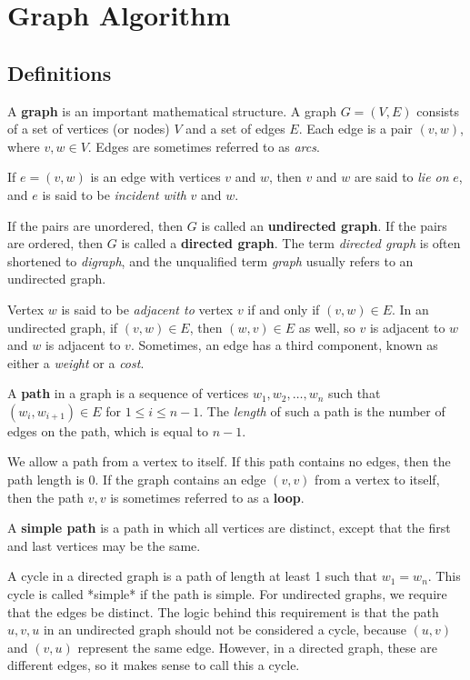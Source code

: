 \chapter{Graph Algorithm}

\section{Definitions}
A \textbf{graph} is an important mathematical structure. A graph \(G = (V, E)\) consists of a set of vertices (or nodes) \(V\) and a set of edges \(E\). Each edge is a pair \((v, w)\), where \(v, w \in V\). Edges are sometimes referred to as \textit{arcs}.

If \(e = (v, w)\) is an edge with vertices \(v\) and \(w\), then \(v\) and \(w\) are said to \textit{lie on} \(e\), and \(e\) is said to be \textit{incident with} \(v\) and \(w\).

If the pairs are unordered, then \(G\) is called an \textbf{undirected graph}. If the pairs are ordered, then \(G\) is called a \textbf{directed graph}. The term \textit{directed graph} is often shortened to \textit{digraph}, and the unqualified term \textit{graph} usually refers to an undirected graph.

Vertex \(w\) is said to be \textit{adjacent to} vertex \(v\) if and only if \((v, w) \in E\). In an undirected graph, if \((v, w) \in E\), then \((w, v) \in E\) as well, so \(v\) is adjacent to \(w\) and \(w\) is adjacent to \(v\). Sometimes, an edge has a third component, known as either a \textit{weight} or a \textit{cost}.

A \textbf{path} in a graph is a sequence of vertices \(w_1, w_2, \ldots, w_n\) such that \((w_i, w_{i+1}) \in E\) for \(1 \leq i \leq n - 1\). The \textit{length} of such a path is the number of edges on the path, which is equal to \(n - 1\). 

We allow a path from a vertex to itself. If this path contains no edges, then the path length is 0. If the graph contains an edge \((v, v)\) from a vertex to itself, then the path \(v, v\) is sometimes referred to as a \textbf{loop}. 

A \textbf{simple path} is a path in which all vertices are distinct, except that the first and last vertices may be the same.

A cycle in a directed graph is a path of length at least 1 such that \(w_1 = w_n\). This cycle is called *simple* if the path is simple. For undirected graphs, we require that the edges be distinct. The logic behind this requirement is that the path \(u, v, u\) in an undirected graph should not be considered a cycle, because \((u, v)\) and \((v, u)\) represent the same edge. However, in a directed graph, these are different edges, so it makes sense to call this a cycle.

